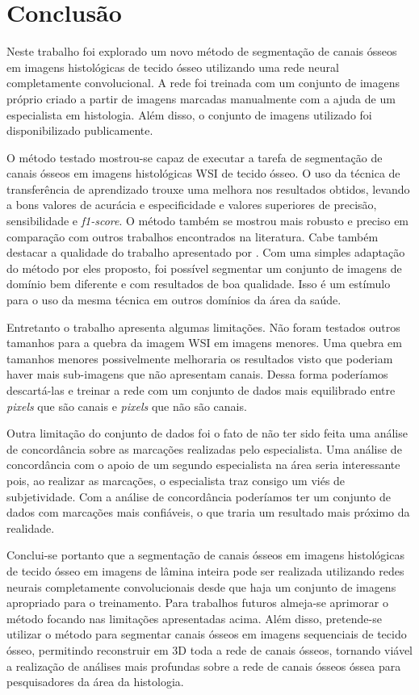 \chapter[Conclusão]{Conclusão}

Neste trabalho foi explorado um novo método de segmentação de canais ósseos em imagens histológicas de tecido ósseo utilizando uma rede neural completamente convolucional. A rede foi treinada com um conjunto de imagens próprio criado a partir de imagens marcadas manualmente com a ajuda de um especialista em histologia. Além disso, o conjunto de imagens utilizado foi disponibilizado publicamente. 

O método testado mostrou-se capaz de executar a tarefa de segmentação de canais ósseos em imagens histológicas WSI de tecido ósseo. O uso da técnica de transferência de aprendizado trouxe uma melhora nos resultados obtidos, levando a bons valores de acurácia e especificidade e valores superiores de precisão, sensibilidade e \textit{f1-score}. O método também se mostrou mais robusto e preciso em comparação com outros trabalhos encontrados na literatura. Cabe também destacar a qualidade do trabalho apresentado por \cite{santos2022automated}. Com uma simples adaptação do método por eles proposto, foi possível segmentar um conjunto de imagens de domínio bem diferente e com resultados de boa qualidade. Isso é um estímulo para o uso da mesma técnica em outros domínios da área da saúde.

Entretanto o trabalho apresenta algumas limitações. Não foram testados outros tamanhos para a quebra da imagem WSI em imagens menores. Uma quebra em tamanhos menores possivelmente melhoraria os resultados visto que  poderiam haver mais sub-imagens que não apresentam canais. Dessa forma poderíamos descartá-las e treinar a rede com um conjunto de dados mais equilibrado entre \textit{pixels} que são canais e \textit{pixels} que não são canais.

Outra limitação do conjunto de dados foi o fato de não ter sido feita uma análise de concordância sobre as marcações realizadas pelo especialista. Uma análise de concordância com o apoio de um segundo especialista na área seria interessante pois, ao realizar as marcações, o especialista traz consigo um viés de subjetividade. Com a análise de concordância poderíamos ter um conjunto de dados com marcações mais confiáveis, o que traria um resultado mais próximo da realidade.

Conclui-se portanto que a segmentação de canais ósseos em imagens histológicas de tecido ósseo em imagens de lâmina inteira pode ser realizada utilizando redes neurais completamente convolucionais desde que haja um conjunto de imagens apropriado para o treinamento. Para trabalhos futuros almeja-se aprimorar o método focando nas limitações apresentadas acima. Além disso, pretende-se utilizar o método para segmentar canais ósseos em imagens sequenciais de tecido ósseo, permitindo reconstruir em 3D toda a rede de canais ósseos, tornando viável a realização de análises mais profundas sobre a rede de canais ósseos óssea para pesquisadores da área da histologia.

